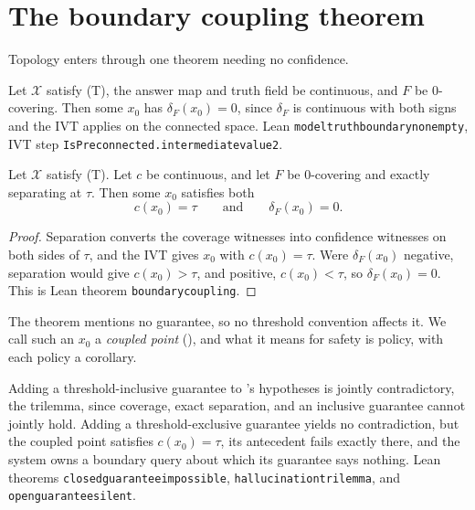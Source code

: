\documentclass[mlmain,onecolumn]{jmlr}
\newcommand{\X}{\mathcal{X}}
\newcommand{\conf}{c}
\newcommand{\dF}{\delta_{\!F}}
\newcommand{\leanid}[1]{{\def\_{\textunderscore\allowbreak}\texttt{#1}}}
\begin{document}
\section{The boundary coupling theorem}
\label{sec:coupling}

Topology enters through one theorem needing no confidence.

\begin{theorem}
\label{thm:boundary}
Let $\X$ satisfy (T), the answer map and truth field be continuous,
and $F$ be $0$-covering. Then some $x_0$ has $\dF(x_0) = 0$, since
$\dF$ is continuous with both signs and the IVT applies on the
connected space. Lean \leanid{model\_truth\_boundary\_nonempty}, IVT
step \leanid{IsPreconnected.intermediate\_value2}.
\end{theorem}

\begin{theorem}
\label{thm:coupling}
Let $\X$ satisfy (T). Let $\conf$ be continuous, and let $F$ be
$0$-covering and exactly separating at $\tau$. Then some $x_0$
satisfies both
\[
\conf(x_0) = \tau \qquad\text{and}\qquad \dF(x_0) = 0 .
\]
\end{theorem}

\begin{proof}
Separation converts the coverage witnesses into confidence
witnesses on both sides of $\tau$, and the IVT gives $x_0$ with
$\conf(x_0) = \tau$. Were $\dF(x_0)$ negative, separation would give
$\conf(x_0) > \tau$, and positive, $\conf(x_0) < \tau$, so
$\dF(x_0) = 0$. This is Lean theorem \leanid{boundary\_coupling}.
\end{proof}

The theorem mentions no guarantee, so no threshold convention
affects it. We call such an $x_0$ a \emph{coupled point}
(), and what it means for safety is
policy, with each policy a corollary.

\begin{corollary}
\label{cor:policy}
Adding a threshold-inclusive guarantee to
's hypotheses is jointly contradictory,
the trilemma, since coverage, exact separation, and an inclusive
guarantee cannot jointly hold. Adding a threshold-exclusive
guarantee yields no contradiction, but the coupled point satisfies
$\conf(x_0) = \tau$, its antecedent fails exactly there, and the
system owns a boundary query about which its guarantee says
nothing. Lean theorems \leanid{closed\_guarantee\_impossible},
\leanid{hallucination\_trilemma}, and
\leanid{open\_guarantee\_silent}.
\end{corollary}
\end{document}
